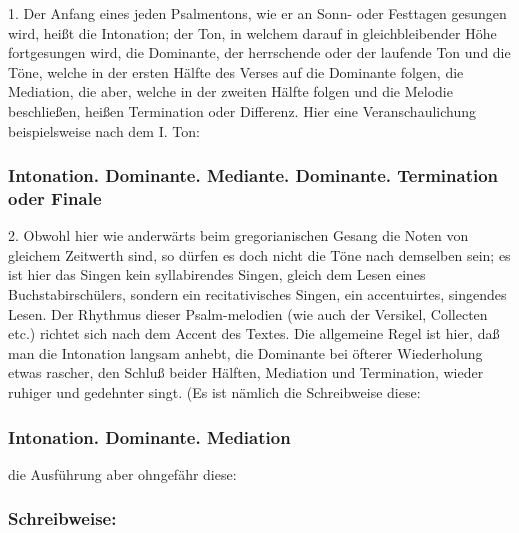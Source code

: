1. Der Anfang eines jeden Psalmentons, wie er an Sonn- oder Festtagen gesungen wird, heißt die Intonation; der Ton, in welchem darauf in gleichbleibender Höhe fortgesungen wird, die Dominante, der herrschende oder der laufende Ton und die Töne, welche in der ersten Hälfte des Verses auf die Dominante folgen, die Mediation, die aber, welche in der zweiten Hälfte folgen und die Melodie beschließen, heißen Termination oder Differenz. Hier eine Veranschaulichung beispielsweise nach dem I. Ton:

\subsubsection[Intonation. Dominante. Mediante]{Intonation. Dominante. Mediante. Dominante. Termination oder Finale}


2. Obwohl hier wie anderwärts beim gregorianischen Gesang die Noten von gleichem Zeitwerth sind, so dürfen es doch nicht die Töne nach demselben sein; es ist hier das Singen kein syllabirendes Singen, gleich dem Lesen eines Buchstabirschülers, sondern ein recitativisches Singen, ein accentuirtes, singendes Lesen. Der Rhythmus dieser Psalm-melodien (wie auch der Versikel, Collecten etc.) richtet sich nach dem Accent des Textes. Die allgemeine Regel ist hier, daß man die Intonation langsam anhebt, die Dominante bei öfterer Wiederholung etwas rascher, den Schluß beider Hälften, Mediation und Termination, wieder ruhiger und gedehnter singt. (Es ist nämlich die Schreibweise diese:

\subsubsection{Intonation. Dominante. Mediation}


die Ausführung aber ohngefähr diese:


\subsubsection{Schreibweise:}

